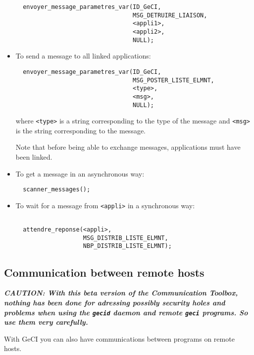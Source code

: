 \documentclass[11pt]{article}
\newcommand{\T}[1]{\texttt{#1}}
\begin{document}
\begin{itemize}
\begin{verbatim} 
  envoyer_message_parametres_var(ID_GeCI,
                                 MSG_DETRUIRE_LIAISON, 
                                 <appli1>,
                                 <appli2>,
                                 NULL);
\end{verbatim}

\item To send a message to all linked applications:

\begin{verbatim} 
  envoyer_message_parametres_var(ID_GeCI,
                                 MSG_POSTER_LISTE_ELMNT,
                                 <type>,
                                 <msg>,
                                 NULL);
\end{verbatim}

where \T{<type>} is a string corresponding to the type of the message
and \T{<msg>} is the string corresponding to the message.

Note that before being able to exchange messages, applications must
have been linked.

\item To get a message in an asynchronous way:

\begin{verbatim}
  scanner_messages();
\end{verbatim}
 
\item To wait for a message from \T{<appli>} in a synchronous way:
\begin{verbatim}

  attendre_reponse(<appli>,
                   MSG_DISTRIB_LISTE_ELMNT,
                   NBP_DISTRIB_LISTE_ELMNT);
\end{verbatim}
\end{itemize}

\subsection{Communication between remote hosts}\label{remote}

\emph{\textbf{
CAUTION: With this beta version of the Communication Toolbox, nothing
has been done for adressing possibly security holes and problems when
using the \T{gecid} daemon and remote \T{geci} programs. So use them
very carefully.
}}

\medskip

With GeCI you can also have communications between programs on remote
hosts.
\end{document}
